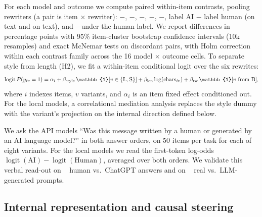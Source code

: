 For each model and outcome we compute paired within-item contrasts, pooling rewriters (a pair is item $\times$ rewriter): \vL{}$-$\vH, \vS{}$-$\vH, \vL{}$-$\vS, \vORIG{}$-$\vH, \vPOL{}$-$\vORIG, label AI $-$ label human (on \vH text and on \vL text), and \vL{}$-$\vH under the human label.
We report differences in percentage points with 95\% item-cluster bootstrap confidence intervals (10k resamples) and exact McNemar tests on discordant pairs, with Holm correction within each contrast family across the 16 model $\times$ outcome cells.
To separate style from length (H2), we fit a within-item conditional logit over the six rewrites:
\begin{equation}
    \operatorname{logit} P(y_{iv}=1) = \alpha_i + \beta_{\text{style}}\,\mathbb{1}[v \in \{\vL,\vS\}] + \beta_{\text{len}} \log(\text{chars}_{iv}) + \beta_{\text{rw}}\,\mathbb{1}[v \text{ from B}],
    \label{eq:clogit}
\end{equation}
where $i$ indexes items, $v$ variants, and $\alpha_i$ is an item fixed effect conditioned out.
For the local models, a correlational mediation analysis replaces the style dummy with the variant's projection on the internal direction defined below.

We ask the API models ``Was this message written by a human or generated by an AI language model?'' in both answer orders, on 50 items per task for each of eight variants.
For the local models we read the first-token log-odds $\operatorname{logit}(\text{AI})-\operatorname{logit}(\text{Human})$, averaged over both orders.
We validate this verbal read-out on \hcthree~\citep{guo2023close} human vs.\ ChatGPT answers and on \polistance~\citep{chalkidis2026templated} real vs.\ LLM-generated prompts.

\subsection{Internal representation and causal steering}
\label{sec:steer_method}

